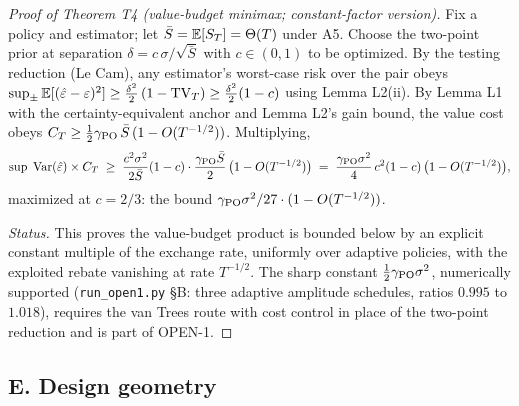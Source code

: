 \documentclass[11pt]{article}
\begin{document}
\begin{proof}[Proof of Theorem T4 (value-budget minimax; constant-factor
version)]
Fix a policy and estimator; let $\bar S = \mathbb{E}[S_T] = \Theta(T)$ under A5.
Choose the two-point prior at separation $\delta = c\,\sigma/\sqrt{\bar S}$
with $c \in (0,1)$ to be optimized. By the testing reduction (Le Cam), any
estimator's worst-case risk over the pair obeys
$\sup_{\pm} \mathbb{E}[(\hat{\varepsilon} - \varepsilon)^2] \ge \tfrac{\delta^2}{2}\,(1 - \mathrm{TV}_T)
\ge \tfrac{\delta^2}{2}(1 - c)$ using Lemma L2(ii). By Lemma L1 with the
certainty-equivalent anchor and Lemma L2's gain bound, the value cost obeys
$C_T \ge \tfrac{1}{2}\gamma_{\mathrm{PO}}\,\bar S\,(1 - O(T^{-1/2}))$. Multiplying,
\[
\sup\; \operatorname{Var}(\hat{\varepsilon})\times C_T
 \;\ge\; \frac{c^2\sigma^2}{2\bar S}(1-c)\cdot
 \frac{\gamma_{\mathrm{PO}} \bar S}{2}\,\big(1 - O(T^{-1/2})\big)
 \;=\; \frac{\gamma_{\mathrm{PO}}\sigma^2}{4}\,c^2(1-c)\,\big(1 - O(T^{-1/2})\big),
\]
maximized at $c = 2/3$: the bound $\gamma_{\mathrm{PO}}\sigma^2/27 \cdot (1 - O(T^{-1/2}))$.

\emph{Status.} This proves the value-budget product is bounded below by an
explicit constant multiple of the exchange rate, uniformly over adaptive
policies, with the exploited rebate vanishing at rate $T^{-1/2}$. The
sharp constant $\tfrac{1}{2}\gamma_{\mathrm{PO}}\sigma^2$, numerically supported
(\texttt{run\_open1.py} \S B: three adaptive amplitude schedules, ratios
$0.995$ to $1.018$), requires the van Trees route with
cost control in place of the two-point reduction and is part of OPEN-1.
\end{proof}

\subsection*{E. Design geometry}
\end{document}
